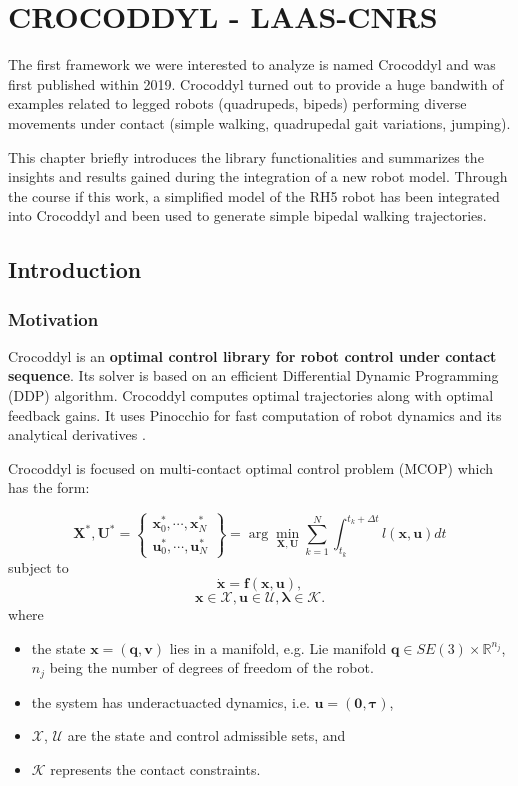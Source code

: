 \chapter{CROCODDYL - LAAS-CNRS}\label{chapter1}
The first framework we were interested to analyze is named Crocoddyl and was first published within 2019. Crocoddyl turned out to provide a huge bandwith of examples related to legged robots (quadrupeds, bipeds) performing diverse movements under contact (simple walking, quadrupedal gait variations, jumping). 

This chapter briefly introduces the library functionalities and summarizes the insights and results gained during the integration of a new robot model. Through the course if this work, a simplified model of the RH5 robot has been integrated into Crocoddyl and been used to generate simple bipedal walking trajectories. 


 
\section{Introduction}
\subsection{Motivation}
Crocoddyl is an \textbf{optimal control library for robot control under contact sequence}. Its solver is based on an efficient Differential Dynamic Programming (DDP) algorithm. Crocoddyl computes optimal trajectories along with optimal feedback gains. It uses Pinocchio for fast computation of robot dynamics and its analytical derivatives \cite{crocoddylweb}. 

Crocoddyl is focused on multi-contact optimal control problem (MCOP) which has the form:

$$\mathbf{X}^*,\mathbf{U}^*=
\begin{Bmatrix} \mathbf{x}^*_0,\cdots,\mathbf{x}^*_N \\
				  \mathbf{u}^*_0,\cdots,\mathbf{u}^*_N
\end{Bmatrix} =
\arg\min_{\mathbf{X},\mathbf{U}} \sum_{k=1}^N \int_{t_k}^{t_k+\Delta t} l(\mathbf{x},\mathbf{u})dt$$
subject to
$$ \mathbf{\dot{x}} = \mathbf{f}(\mathbf{x},\mathbf{u}),$$
$$ \mathbf{x}\in\mathcal{X}, \mathbf{u}\in\mathcal{U}, \boldsymbol{\lambda}\in\mathcal{K}.$$
where
\begin{itemize}
\item the state $\mathbf{x}=(\mathbf{q},\mathbf{v})$ lies in a manifold, e.g. Lie manifold $\mathbf{q}\in SE(3)\times \mathbb{R}^{n_j}$, $n_j$ being the number of degrees of freedom of the robot.
\item the system has underactuacted dynamics, i.e. $\mathbf{u}=(\mathbf{0},\boldsymbol{\tau})$,
\item $\mathcal{X}$, $\mathcal{U}$ are the state and control admissible sets, and
\item $\mathcal{K}$ represents the contact constraints.
\end{itemize}

